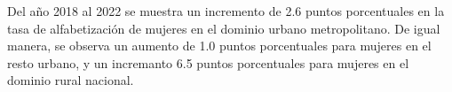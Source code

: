 Del año 2018 al 2022 se muestra un incremento de 2.6 puntos porcentuales en la tasa de alfabetización de mujeres en el dominio urbano metropolitano. De igual manera, se observa un aumento de 1.0 puntos porcentuales para mujeres en el resto urbano, y un incremanto 6.5 puntos porcentuales para mujeres en el dominio rural nacional. 